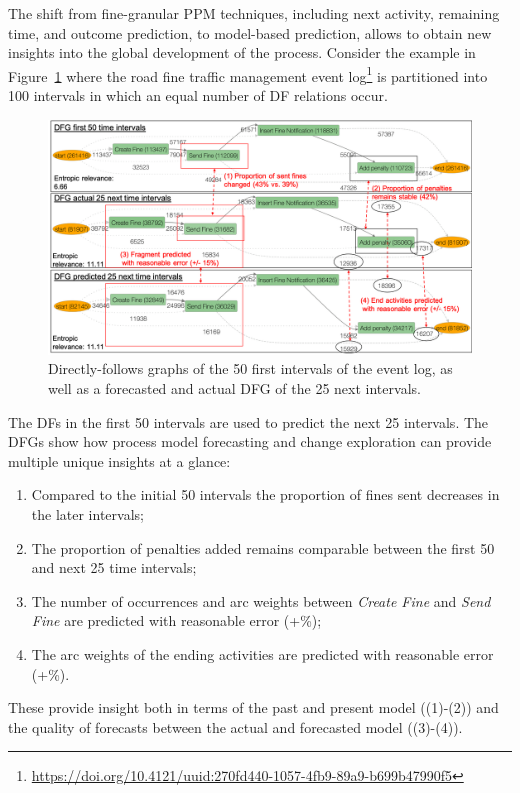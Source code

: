 The shift from fine-granular PPM techniques, including next activity, remaining time, and outcome prediction, to model-based prediction, allows to obtain new insights into the global development of the process.
Consider the example in Figure~\ref{fig:dfg_example_intro} where the road fine traffic management event log\footnote{\url{https://doi.org/10.4121/uuid:270fd440-1057-4fb9-89a9-b699b47990f5}} is partitioned into 100 intervals in which an equal number of DF relations occur.
\begin{figure}
    \centering
    \includegraphics[width=\textwidth]{img/MotExample.png}
    \caption{Directly-follows graphs of the 50 first intervals of the event log, as well as a forecasted and actual DFG of the 25 next intervals.}
    \label{fig:dfg_example_intro}
\end{figure}
The DFs in the first 50 intervals are used to predict the next 25 intervals.
The DFGs show how process model forecasting and change exploration can provide multiple unique insights at a glance:
\begin{enumerate}
    \item Compared to the initial 50 intervals the proportion of fines sent decreases in the later intervals;
    \item The proportion of penalties added remains comparable between the first 50 and next 25 time intervals;
    \item The number of occurrences and arc weights between \emph{Create Fine} and \emph{Send Fine} are predicted with reasonable error (+\%);
    \item The arc weights of the ending activities are predicted with reasonable error (+\%).
\end{enumerate}
These provide insight both in terms of the past and present model ((1)-(2)) and the quality of forecasts between the actual and forecasted model ((3)-(4)).
